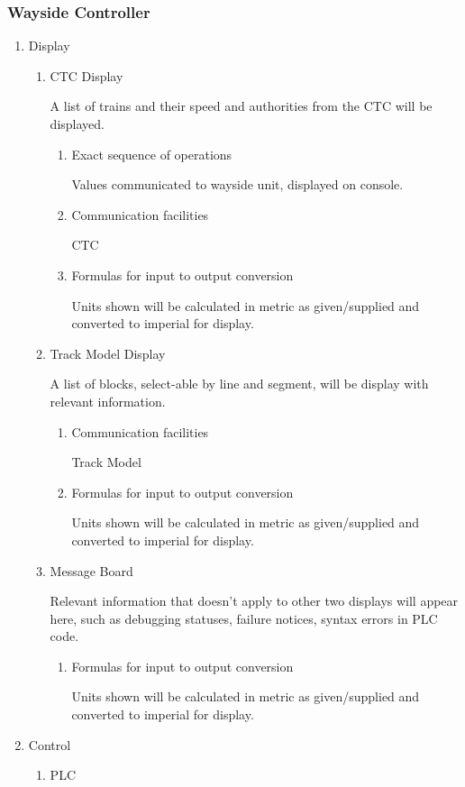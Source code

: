 \documentclass[11pt]{article}
\begin{document}
\subsubsection{Wayside Controller}
\label{sec-3-1-2}
\begin{enumerate}
\item Display
\label{sec-3-1-2-1}
\begin{enumerate}
\item CTC Display
\label{sec-3-1-2-1-1}

A list of trains and their speed and authorities from the CTC will be displayed.
\begin{enumerate}
\item Exact sequence of operations
\label{sec-3-1-2-1-1-1}

Values communicated to wayside unit, displayed on console.
\item Communication facilities
\label{sec-3-1-2-1-1-2}

CTC
\item Formulas for input to output conversion
\label{sec-3-1-2-1-1-3}

Units shown will be calculated in metric as given/supplied and converted to imperial for display.
\end{enumerate}
\item Track Model Display
\label{sec-3-1-2-1-2}

A list of blocks, select-able by line and segment, will be display with relevant information.
\begin{enumerate}
\item Communication facilities
\label{sec-3-1-2-1-2-1}

Track Model
\item Formulas for input to output conversion
\label{sec-3-1-2-1-2-2}

Units shown will be calculated in metric as given/supplied and converted to imperial for display.
\end{enumerate}
\item Message Board
\label{sec-3-1-2-1-3}

Relevant information that doesn't apply to other two displays will appear here, such as debugging statuses, failure notices, syntax errors in PLC code.
\begin{enumerate}
\item Formulas for input to output conversion
\label{sec-3-1-2-1-3-1}

Units shown will be calculated in metric as given/supplied and converted to imperial for display.
\end{enumerate}
\end{enumerate}
\item Control
\label{sec-3-1-2-2}
\begin{enumerate}
\item PLC
\label{sec-3-1-2-2-1}


\end{enumerate}
\end{enumerate}
\end{document}
